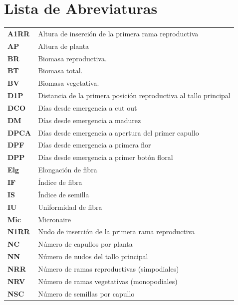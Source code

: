 \documentclass[12pt,oneside]{reedthesis}
\begin{document}
\chapter*{Lista de Abreviaturas}
\begin{table}[h]
    \centering
    \begin{tabular}{ll}
                \textbf{A1RR} & Altura de inserción de la primera rama reproductiva \\
                \textbf{AP} & Altura de planta \\
                \textbf{BR} & Biomasa reproductiva. \\
                \textbf{BT} & Biomasa total. \\
                \textbf{BV} & Biomasa vegetativa. \\
                \textbf{D1P} & Distancia de la primera posición reproductiva al tallo principal \\
                \textbf{DCO} & Días desde emergencia a cut out \\
                \textbf{DM} & Días desde emergencia a madurez \\
                \textbf{DPCA} & Días desde emergencia a apertura del primer capullo \\
                \textbf{DPF} & Días desde emergencia a primera flor \\
                \textbf{DPP} & Días desde emergencia a primer botón floral \\
                \textbf{Elg} & Elongación de fibra \\
                \textbf{IF} & Índice de fibra \\
                \textbf{IS} & Índice de semilla \\
                \textbf{IU} & Uniformidad de fibra \\
                \textbf{Mic} & Micronaire \\
                \textbf{N1RR} & Nudo de inserción de la primera rama reproductiva \\
                \textbf{NC} & Número de capullos por planta \\
                \textbf{NN} & Número de nudos del tallo principal \\
                \textbf{NRR} & Número de ramas reproductivas (simpodiales) \\
                \textbf{NRV} & Número de ramas vegetativas (monopodiales) \\
                \textbf{NSC} & Número de semillas por capullo \\

\end{tabular}
\end{table}
\end{document}
